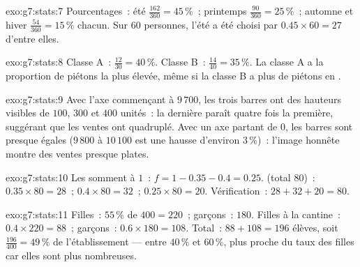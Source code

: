 \begin{solution}{exo:g7:stats:7}
Pourcentages~: été $\frac{162}{360} = 45\,\%$~; printemps
$\frac{90}{360} = 25\,\%$~; automne et hiver
$\frac{54}{360} = 15\,\%$ chacun. Sur $60$ personnes, l'été a été
choisi par $0.45 \times 60 = 27$ d'entre elles.
\end{solution}

\begin{solution}{exo:g7:stats:8}
Classe A~: $\frac{12}{30} = 40\,\%$. Classe B~: $\frac{14}{40} =
35\,\%$. La classe A a la proportion de piétons la plus élevée, même
si la classe B a plus de piétons en .
\end{solution}

\begin{solution}{exo:g7:stats:9}
Avec l'axe commençant à $9\,700$, les trois barres ont des hauteurs
visibles de $100$, $300$ et $400$ unités~: la dernière paraît quatre
fois la première, suggérant que les ventes ont quadruplé. Avec un axe
partant de $0$, les barres sont presque égales ($9\,800$ à $10\,100$
est une hausse d'environ $3\,\%$)~: l'image honnête montre des ventes
presque plates.
\end{solution}

\begin{solution}{exo:g7:stats:10}
Les  somment à $1$~: $f = 1 - 0.35 - 0.4 = 0.25$.
 (total $80$)~: $0.35 \times 80 = 28$~; $0.4 \times 80 =
32$~; $0.25 \times 80 = 20$. Vérification~: $28 + 32 + 20 = 80$.
\end{solution}

\begin{solution}{exo:g7:stats:11}
Filles~: $55\,\%$ de $400 = 220$~; garçons~: $180$. Filles à la
cantine~: $0.4 \times 220 = 88$~; garçons~: $0.6 \times 180 = 108$.
Total~: $88 + 108 = 196$ élèves, soit $\frac{196}{400} = 49\,\%$ de
l'établissement --- entre $40\,\%$ et $60\,\%$, plus proche du taux
des filles car elles sont plus nombreuses.
\end{solution}

